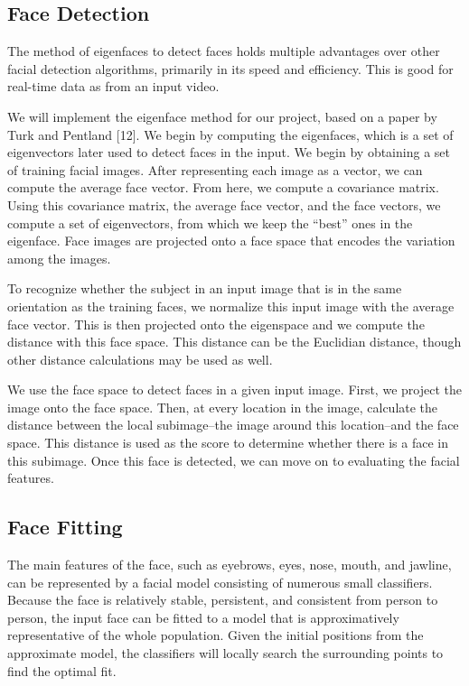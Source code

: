 \documentclass[10pt,twocolumn,letterpaper]{article}
\begin{document}
\subsection{Face Detection}

The method of eigenfaces to detect faces holds multiple advantages over other facial detection algorithms, primarily in its speed and efficiency. This is good for real-time data as from an input video.

We will implement the eigenface method for our project, based on a paper by Turk and Pentland [12]. We begin by computing the eigenfaces, which is a set of eigenvectors later used to detect faces in the input. We begin by obtaining a set of training facial images. After representing each image as a vector, we can compute the average face vector. From here, we compute a covariance matrix. Using this covariance matrix, the average face vector, and the face vectors, we compute a set of eigenvectors, from which we keep the ``best'' ones in the eigenface. Face images are projected onto a face space that encodes the variation among the images.

To recognize whether the subject in an input image that is in the same orientation as the training faces, we normalize this input image with the average face vector. This is then projected onto the eigenspace and we compute the distance with this face space. This distance can be the Euclidian distance, though other distance calculations may be used as well.

We use the face space to detect faces in a given input image. First, we project the image onto the face space. Then, at every location in the image, calculate the distance between the local subimage--the image around this location--and the face space. This distance is used as the score to determine whether there is a face in this subimage. Once this face is detected, we can move on to evaluating the facial features.

\subsection{Face Fitting}

The main features of the face, such as eyebrows, eyes, nose, mouth, and jawline, can be represented by a facial model consisting of numerous small classifiers. Because the face is relatively stable, persistent, and consistent from person to person, the input face can be fitted to a model that is approximatively representative of the whole population. Given the initial positions from the approximate model, the classifiers will locally search the surrounding points to find the optimal fit. 
\end{document}
